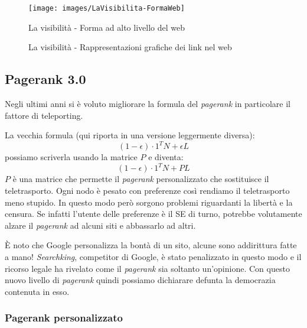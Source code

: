 				\begin{figure}
					\centering
					\texttt{[image: images/LaVisibilita-FormaWeb]}
					\caption{La visibilità - Forma ad alto livello del web}
					\label{fig:LaVisibilita-FormaWeb}
				\end{figure}								
				
				\begin{figure} [h]
					 \quad
					\caption{La visibilità - Rappresentazioni grafiche dei link nel web}
					
				\end{figure}
			
		\subsection{Pagerank 3.0}
			Negli ultimi anni si è voluto migliorare la formula del \emph{pagerank} in particolare il fattore di teleporting.
			
			La vecchia formula (qui riporta in una versione leggermente diversa):
			\[
				(1-\epsilon )\cdot 1^T N + \epsilon L
			\]
			possiamo scriverla usando la matrice $P$ e diventa:
			\[
				(1- \epsilon )\cdot 1^T N + PL
			\]
			$P$ è una matrice che permette il \emph{pagerank} personalizzato che sostituisce il teletrasporto. Ogni nodo è pesato con preferenze così rendiamo il teletrasporto meno stupido. In questo modo però sorgono problemi riguardanti la libertà e la censura. Se infatti l'utente delle preferenze è il SE di turno, potrebbe volutamente alzare il \emph{pagerank} ad alcuni siti e abbassarlo ad altri. 
			
			È noto che Google personalizza la bontà di un sito, alcune sono addirittura fatte a mano! \emph{Searchking}, competitor di Google, è stato penalizzato in questo modo e il ricorso legale ha rivelato come il \emph{pagerank} sia soltanto un'opinione.
			Con questo nuovo livello di \emph{pagerank} quindi possiamo dichiarare defunta la democrazia contenuta in esso.
		
			\subsubsection{Pagerank personalizzato}
			
